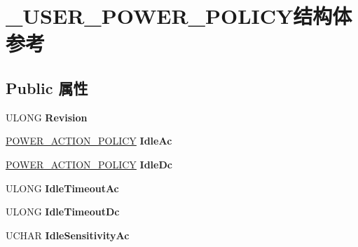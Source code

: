 \hypertarget{struct___u_s_e_r___p_o_w_e_r___p_o_l_i_c_y}{}\section{\+\_\+\+U\+S\+E\+R\+\_\+\+P\+O\+W\+E\+R\+\_\+\+P\+O\+L\+I\+C\+Y结构体 参考}
\label{struct___u_s_e_r___p_o_w_e_r___p_o_l_i_c_y}
\subsection*{Public 属性}
\begin{DoxyCompactItemize}
\item 
\mbox{\label{struct___u_s_e_r___p_o_w_e_r___p_o_l_i_c_y_ad1f8aafddcf2f85c61847c99d747c9c8}} 
U\+L\+O\+NG {\bfseries Revision}
\item 
\mbox{\label{struct___u_s_e_r___p_o_w_e_r___p_o_l_i_c_y_a241bf9d7263d83e205c2e4fe0a7b0ad0}} 
\hyperlink{struct___p_o_w_e_r___a_c_t_i_o_n___p_o_l_i_c_y}{P\+O\+W\+E\+R\+\_\+\+A\+C\+T\+I\+O\+N\+\_\+\+P\+O\+L\+I\+CY} {\bfseries Idle\+Ac}
\item 
\mbox{\label{struct___u_s_e_r___p_o_w_e_r___p_o_l_i_c_y_ab0c3e62a35ad1c8e36c559d7db105762}} 
\hyperlink{struct___p_o_w_e_r___a_c_t_i_o_n___p_o_l_i_c_y}{P\+O\+W\+E\+R\+\_\+\+A\+C\+T\+I\+O\+N\+\_\+\+P\+O\+L\+I\+CY} {\bfseries Idle\+Dc}
\item 
\mbox{\label{struct___u_s_e_r___p_o_w_e_r___p_o_l_i_c_y_a67b0ba0b10f5a5d1b86333ebd275fd78}} 
U\+L\+O\+NG {\bfseries Idle\+Timeout\+Ac}
\item 
\mbox{\label{struct___u_s_e_r___p_o_w_e_r___p_o_l_i_c_y_ad3bb53b9c0aa1c792563a17c12deeae0}} 
U\+L\+O\+NG {\bfseries Idle\+Timeout\+Dc}
\item 
\mbox{\label{struct___u_s_e_r___p_o_w_e_r___p_o_l_i_c_y_acec63909cc1dc9d26d4b51e10078a60a}} 
U\+C\+H\+AR {\bfseries Idle\+Sensitivity\+Ac}
\item 

\end{DoxyCompactItemize}
